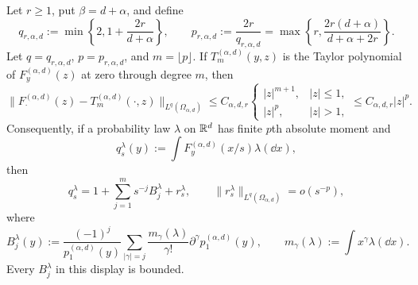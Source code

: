 \begin{lemma}
\label{lem:all-order-stable-critical-remainder}
Let \(r\ge1\), put \(\beta=d+\alpha\), and define
\begin{equation}\label{eq:all-order-stable-critical-exponents}
 q_{r,\alpha,d}:=\min\left\{2,1+\frac{2r}{d+\alpha}\right\},
 \qquad
 p_{r,\alpha,d}:=\frac{2r}{q_{r,\alpha,d}}
 =\max\left\{r,\frac{2r(d+\alpha)}{d+\alpha+2r}\right\}.
\end{equation}
Let \(q=q_{r,\alpha,d}\), \(p=p_{r,\alpha,d}\), and
\(m=\lfloor p\rfloor\).  If \(T_m^{(\alpha,d)}(y,z)\) is the Taylor
polynomial of \(F_y^{(\alpha,d)}(z)\) at zero through degree \(m\), then
\begin{equation}\label{eq:all-order-stable-critical-remainder}
 \|F_\cdot^{(\alpha,d)}(z)-T_m^{(\alpha,d)}(\cdot,z)\|_{L^q(\Omega_{\alpha,d})}
 \le C_{\alpha,d,r}
 \begin{cases}
  |z|^{m+1},&|z|\le1,\\
  |z|^p,&|z|>1,
 \end{cases}
 \le C_{\alpha,d,r}|z|^p.
\end{equation}
Consequently, if a probability law \(\lambda\) on \(\mathbb{R}^d\) has finite
\(p\)th absolute moment and
\[
 q_s^\lambda(y):=\int F_y^{(\alpha,d)}(x/s)\lambda(\dd x),
\]
then
\begin{equation}\label{eq:all-order-stable-integrated-remainder}
 q_s^\lambda
 =1+\sum_{j=1}^m s^{-j}B_j^\lambda+r_s^\lambda,
 \qquad
 \|r_s^\lambda\|_{L^q(\Omega_{\alpha,d})}=o(s^{-p}),
\end{equation}
where
\begin{equation}\label{eq:all-order-stable-moment-modes}
 B_j^\lambda(y):=
 \frac{(-1)^j}{p_1^{(\alpha,d)}(y)}
 \sum_{|\gamma|=j}\frac{m_\gamma(\lambda)}{\gamma!}
 \partial^\gamma p_1^{(\alpha,d)}(y),
 \qquad
 m_\gamma(\lambda):=\int x^\gamma\lambda(\dd x).
\end{equation}
Every \(B_j^\lambda\) in this display is bounded.
\end{lemma}

